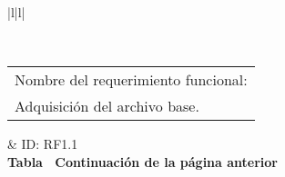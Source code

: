 \begin{longtable}{|l|l|}
\caption{Requerimiento funcional 1.1}
\label{RF11}\\
\hline
\begin{tabular}[c]{@{}l@{}}Nombre del requerimiento funcional:\\ Adquisición del archivo base.\end{tabular}                                                                                                                                                                               & ID: RF1.1                                                                                                                                     \\ \hline
\endfirsthead
%
%
{{\bfseries Tabla \thetable\ Continuación de la página anterior}} \\
\endhead
%
                                                                                                                                                                                                                                                                                                                                                                                      \\ \hline
{}                                                                                                                                                                                                                                                                                                                                                                                     \\ \hline
{}                                                                                                                                                                                                                                                                                                                                                                                               \\ \hline
{}                                                                                                                                                                                                                                                                                                                                  \\ \hline

\end{longtable}
